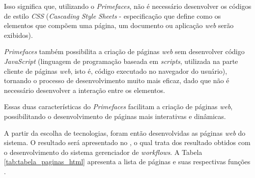 Isso significa que, utilizando o \textit{Primefaces}, não é necessário desenvolver os códigos de estilo \textit{CSS} \cite{css_rfc} (\textit{Cascading Style Sheets} - especificação que define como os elementos que compõem uma página, um documento ou aplicação \textit{web} serão exibidos). 

\textit{Primefaces} também possibilita a criação de páginas \textit{web} sem desenvolver código \textit{JavaScript} \cite{js_rfc} (linguagem de programação baseada em \textit{scripts}, utilizada na parte cliente de páginas \textit{web}, isto é, código executado no navegador do usuário), tornando o processo de desenvolvimento muito mais eficaz, dado que não é necessário desenvolver a interação entre os elementos. 

Essas duas características do \textit{Primefaces} facilitam a criação de páginas \textit{web}, possibilitando o desenvolvimento de páginas mais interativas e dinâmicas.

A partir da escolha de tecnologias, foram então desenvolvidas as páginas \textit{web} do sistema. O resultado será apresentado no , o qual trata dos resultado obtidos com o desenvolvimento do sistema gerenciador de \textit{workflows}. A Tabela \ref{tab:tabela_paginas_html} apresenta a lista de páginas e suas respectivas funções .

\begin{table}[H]
\centering
{}
\caption{Lista de páginas \textit{HTML} e as respectivas funções no sistema.}
\label{tab:tabela_paginas_html}
\end{table}

